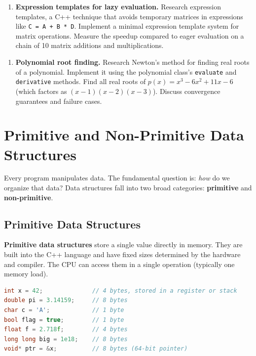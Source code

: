 \begin{enumerate}
\item \textbf{Expression templates for lazy evaluation.} Research expression templates, a C++ technique that avoids temporary matrices in expressions like \texttt{C = A + B * D}. Implement a minimal expression template system for matrix operations. Measure the speedup compared to eager evaluation on a chain of 10 matrix additions and multiplications.
\end{enumerate}

\begin{enumerate}
\item \textbf{Polynomial root finding.} Research Newton's method for finding real roots of a polynomial. Implement it using the polynomial class's \texttt{evaluate} and \texttt{derivative} methods. Find all real roots of $p(x) = x^{3} - 6x^{2} + 11x - 6$ (which factors as $(x-1)(x-2)(x-3)$). Discuss convergence guarantees and failure cases.
\end{enumerate}

\section{Primitive and Non-Primitive Data Structures}

\label{sec:primitive-nonprimitive}

Every program manipulates data. The fundamental question is: \emph{how} do we organize that data? Data structures fall into two broad categories: \textbf{primitive} and \textbf{non-primitive}.

\subsection{Primitive Data Structures}

\textbf{Primitive data structures} store a single value directly in memory. They are built into the C++ language and have fixed sizes determined by the hardware and compiler. The CPU can access them in a single operation (typically one memory load).

\begin{lstlisting}[language=C++]
int x = 42;              // 4 bytes, stored in a register or stack
double pi = 3.14159;     // 8 bytes
char c = 'A';            // 1 byte
bool flag = true;        // 1 byte
float f = 2.718f;        // 4 bytes
long long big = 1e18;    // 8 bytes
void* ptr = &x;          // 8 bytes (64-bit pointer)
\end{lstlisting}

